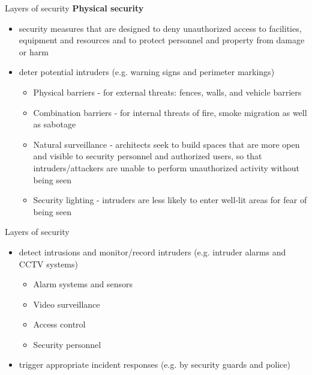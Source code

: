 \documentclass[pdf]{beamer}
\begin{document}
\begin{frame}{Layers of security}
\textbf{Physical security}
\begin{itemize}
\item
security measures that are designed to deny unauthorized access to facilities, equipment and resources and to protect personnel and property from damage or harm

\item
deter potential intruders (e.g. warning signs and perimeter markings)

\begin{itemize}
\item
Physical barriers - for external threats: fences, walls, and vehicle barriers

\item
Combination barriers - for internal threats of fire, smoke migration as well as sabotage

\item
Natural surveillance - architects seek to build spaces that are more open and visible to security personnel and authorized users, so that intruders/attackers are unable to perform unauthorized activity without being seen

\item
Security lighting - intruders are less likely to enter well-lit areas for fear of being seen

\end{itemize}

\end{itemize}
\end{frame}



\begin{frame}{Layers of security}
\begin{itemize}
\item
detect intrusions and monitor/record intruders (e.g. intruder alarms and CCTV systems)
\begin{itemize}
\item
Alarm systems and sensors

\item
Video surveillance

\item
Access control

\item
Security personnel

\end{itemize}


\item
trigger appropriate incident responses (e.g. by security guards and police)

\end{itemize}
\end{frame}
\end{document}
